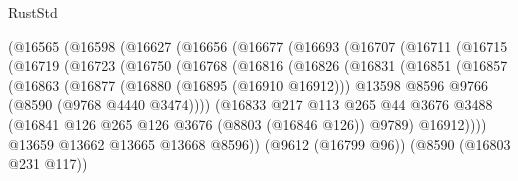 \begin{lexlean}{RustStd}
\begin{coremodule}
                  (@16565
                    (@16598
                      (@16627
                        (@16656
                          (@16677
                            (@16693
                              (@16707
                                (@16711
                                  (@16715
                                    (@16719
                                      (@16723
                                        (@16750
                                          (@16768
                                            (@16816
                                              (@16826
                                                (@16831
                                                  (@16851
                                                    (@16857
                                                      (@16863
                                                        (@16877
                                                          (@16880 (@16895 (@16910 @16912)))
                                                          @13598
                                                          @8596
                                                          @9766
                                                          (@8590 (@9768 @4440 @3474))))
                                                      (@16833
                                                        @217
                                                        @113
                                                        @265
                                                        @44
                                                        @3676
                                                        @3488
                                                        (@16841
                                                          @126
                                                          @265
                                                          @126
                                                          @3676
                                                          (@8803 (@16846 @126))
                                                          @9789)
                                                        @16912))))
                                                @13659
                                                @13662
                                                @13665
                                                @13668
                                                @8596))
                                            (@9612 (@16799 @96))
                                            (@8590 (@16803 @231 @117))

\end{coremodule}
\end{lexlean}
